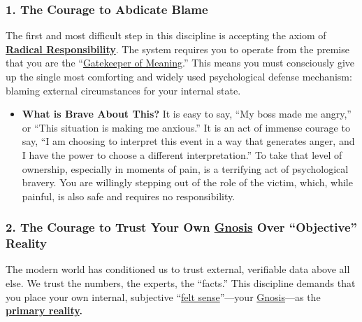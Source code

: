 \documentclass{article}
\begin{document}
\subsubsection*{1. The Courage to Abdicate Blame}\label{the-courage-to-abdicate-blame}

The first and most difficult step in this discipline is accepting the axiom of \textbf{\hyperlink{gloss:radical_responsibility}{Radical Responsibility}}. The system requires you to operate from the premise that you are the ``\hyperlink{gloss:gatekeeper_of_meaning}{Gatekeeper of Meaning}.'' This means you must consciously give up the single most comforting and widely used psychological defense mechanism: blaming external circumstances for your internal state.

\begin{itemize}
\item
  \textbf{What is Brave About This?} It is easy to say, ``My boss made me angry,'' or ``This situation is making me anxious.'' It is an act of immense courage to say, ``I am choosing to interpret this event in a way that generates anger, and I have the power to choose a different interpretation.'' To take that level of ownership, especially in moments of pain, is a terrifying act of psychological bravery. You are willingly stepping out of the role of the victim, which, while painful, is also safe and requires no responsibility.
\end{itemize}

\subsubsection*{2. The Courage to Trust Your Own \hyperlink{gloss:gnosis}{Gnosis} Over ``Objective'' Reality}\label{the-courage-to-trust-your-own-gnosis-over-objective-reality}

The modern world has conditioned us to trust external, verifiable data above all else. We trust the numbers, the experts, the ``facts.'' This discipline demands that you place your own internal, subjective ``\hyperlink{gloss:felt_sense}{felt sense}''---your \hyperlink{gloss:gnosis}{Gnosis}---as the \textbf{\hyperlink{gloss:primary_reality}{primary reality}.}
\end{document}
